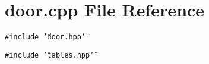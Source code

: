 \section{door.cpp File Reference}
\label{door_8cpp}
{\tt \#include \char`\"{}door.hpp\char`\"{}}\par
{\tt \#include \char`\"{}tables.hpp\char`\"{}}\par
